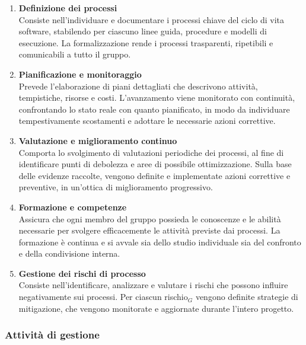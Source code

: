 \documentclass[a4paper, 10pt]{article}
\begin{document}
\begin{enumerate}
    \item \textbf{Definizione dei processi}\\
    Consiste nell'individuare e documentare i processi chiave del ciclo di vita software, stabilendo per ciascuno linee guida, procedure e modelli di esecuzione. La formalizzazione rende i processi trasparenti, ripetibili e comunicabili a tutto il gruppo.

    \item \textbf{Pianificazione e monitoraggio}\\
    Prevede l'elaborazione di piani dettagliati che descrivono attività, tempistiche, risorse e costi. L'avanzamento viene monitorato con continuità, confrontando lo stato reale con quanto pianificato, in modo da individuare tempestivamente scostamenti e adottare le necessarie azioni correttive.

    \item \textbf{Valutazione e miglioramento continuo}\\
    Comporta lo svolgimento di valutazioni periodiche dei processi, al fine di identificare punti di debolezza e aree di possibile ottimizzazione. Sulla base delle evidenze raccolte, vengono definite e implementate azioni correttive e preventive, in un'ottica di miglioramento progressivo.

    \item \textbf{Formazione e competenze}\\
    Assicura che ogni membro del gruppo possieda le conoscenze e le abilità necessarie per svolgere efficacemente le attività previste dai processi. La formazione è continua e si avvale sia dello studio individuale sia del confronto e della condivisione interna.

    \item \textbf{Gestione dei rischi di processo}\\
    Consiste nell'identificare, analizzare e valutare i rischi che possono influire negativamente sui processi. Per ciascun rischio$_G$ vengono definite strategie di mitigazione, che vengono monitorate e aggiornate durante l'intero progetto.
\end{enumerate}

\subsubsection{Attività di gestione}
\label{subsubsec:attivita_gestione}
\end{document}
